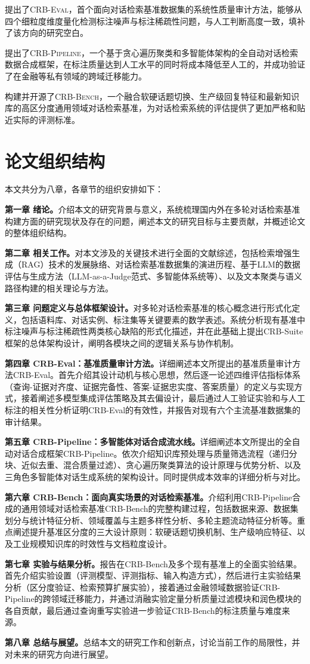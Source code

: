 提出了\textsc{CRB-Eval}，首个面向对话检索基准数据集的系统性质量审计方法，能够从四个细粒度维度量化检测标注噪声与标注稀疏性问题，与人工判断高度一致，填补了该方向的研究空白。
    
提出了\textsc{CRB-Pipeline}，一个基于贪心遍历聚类和多智能体架构的全自动对话检索数据合成框架，在标注质量达到人工水平的同时将成本降低至人工的，并成功验证了在金融等私有领域的跨域迁移能力。
    
构建并开源了\textsc{CRB-Bench}，一个融合软硬话题切换、生产级回复特征和最新知识库的高区分度通用领域对话检索基准，为对话检索系统的评估提供了更加严格和贴近实际的评测标准。



\section{论文组织结构}

本文共分为八章，各章节的组织安排如下：

\textbf{第一章 绪论。}介绍本文的研究背景与意义，系统梳理国内外在多轮对话检索基准构建方面的研究现状及存在的问题，阐述本文的研究目标与主要贡献，并概述论文的整体组织结构。

\textbf{第二章 相关工作。}对本文涉及的关键技术进行全面的文献综述，包括检索增强生成（RAG）技术的发展脉络、对话检索基准数据集的演进历程、基于LLM的数据评估与生成方法（LLM-as-a-Judge范式、多智能体系统等）、以及文本聚类与语义路径构建的相关理论与方法。

\textbf{第三章 问题定义与总体框架设计。}对多轮对话检索基准的核心概念进行形式化定义，包括语料库、对话实例、标注集等关键要素的数学表述。系统分析现有基准中标注噪声与标注稀疏性两类核心缺陷的形式化描述，并在此基础上提出CRB-Suite框架的总体架构设计，阐明各模块之间的逻辑关系与协作机制。

\textbf{第四章 CRB-Eval：基准质量审计方法。}详细阐述本文所提出的基准质量审计方法CRB-Eval。首先介绍其设计动机与核心思想，然后逐一论述四维评估指标体系（查询-证据对齐度、证据完备性、答案-证据忠实度、答案质量）的定义与实现方式，接着阐述多模型集成评估策略及其去偏设计，最后通过人工验证实验和与人工标注的相关性分析证明CRB-Eval的有效性，并报告对现有六个主流基准数据集的审计结果。

\textbf{第五章 CRB-Pipeline：多智能体对话合成流水线。}详细阐述本文所提出的全自动对话合成框架CRB-Pipeline。依次介绍知识库预处理与质量筛选流程（递归分块、近似去重、混合质量过滤）、贪心遍历聚类算法的设计原理与优势分析、以及三角色多智能体对话生成系统的架构设计。同时提供成本效率的详细分析与对比。

\textbf{第六章 CRB-Bench：面向真实场景的对话检索基准。}介绍利用CRB-Pipeline合成的通用领域对话检索基准CRB-Bench的完整构建过程，包括数据来源、数据集划分与统计特征分析、领域覆盖与主题多样性分析、多轮主题流动特征分析等。重点阐述提升基准区分度的三大设计原则：软硬话题切换机制、生产级响应特征、以及工业规模知识库的时效性与文档粒度设计。

\textbf{第七章 实验与结果分析。}报告在CRB-Bench及多个现有基准上的全面实验结果。首先介绍实验设置（评测模型、评测指标、输入构造方式），然后进行主实验结果分析（区分度验证、检索预算扩展实验），接着通过金融领域数据验证CRB-Pipeline的跨领域迁移能力，并通过消融实验定量分析质量过滤模块和润色模块的各自贡献，最后通过查询重写实验进一步验证CRB-Bench的标注质量与难度来源。

\textbf{第八章 总结与展望。}总结本文的研究工作和创新点，讨论当前工作的局限性，并对未来的研究方向进行展望。

